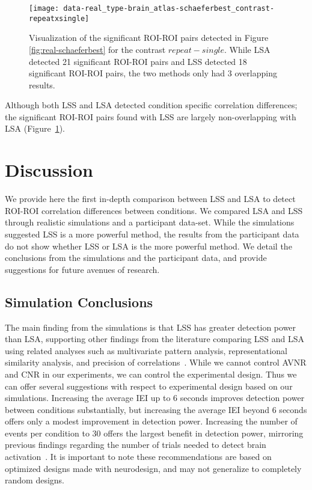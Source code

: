 \documentclass[phd,figures,tables,ackpage,abstractpage,publicabstractpage]{uithesis}
\begin{document}
\begin{figure}[H]
  \centering
  \texttt{[image: 
    data-real\_type-brain\_atlas-schaeferbest\_contrast-repeatxsingle]}
  \caption[SchaeferTop20 atlas, real data, repeat - single]{
    Visualization of the significant ROI-ROI pairs detected in Figure \ref{fig:real-schaeferbest}
    for the contrast $repeat - single$.
    While LSA detected 21 significant ROI-ROI pairs and LSS detected 18 significant
    ROI-ROI pairs, the two methods only had 3 overlapping results.
  }
\label{fig:non-overlap}
\end{figure}

Although both LSS and LSA detected condition specific correlation differences;
the significant ROI-ROI pairs found with LSS are largely non-overlapping with LSA (Figure~\ref{fig:non-overlap}).

\section{Discussion}
\label{discussion}

We provide here the first in-depth comparison between LSS and LSA to detect 
ROI-ROI correlation differences between conditions.
We compared LSA and LSS through realistic simulations and a participant data-set.
While the simulations suggested LSS is a more powerful method,
the results from the participant data do not show whether LSS or LSA is the more powerful method.
We detail the conclusions from the simulations and the participant data, and provide
suggestions for future avenues of research.

\subsection{Simulation Conclusions}
\label{discussion:simulation-conclusions}

The main finding from the simulations is that LSS has greater detection power than LSA,
supporting other findings from the literature comparing LSS and LSA using related analyses such as
multivariate pattern analysis, representational similarity analysis, and precision of correlations~\cite{Mumford2012,Mumford2014a,Abdulrahman2016,Turner2012a}.
While we cannot control AVNR and CNR in our experiments, we can control the experimental design.
Thus we can offer several suggestions with respect to experimental design based on our simulations.
Increasing the average IEI up to 6 seconds improves detection power between conditions substantially,
but increasing the average IEI beyond 6 seconds offers only a modest improvement in detection power.
Increasing the number of events per condition to 30 offers the largest benefit in detection power,
mirroring previous findings regarding the number of trials needed to detect brain activation~\cite{Huettel2001}.
It is important to note these recommendations are based on optimized designs made with neurodesign,
and may not generalize to completely random designs.
\end{document}
